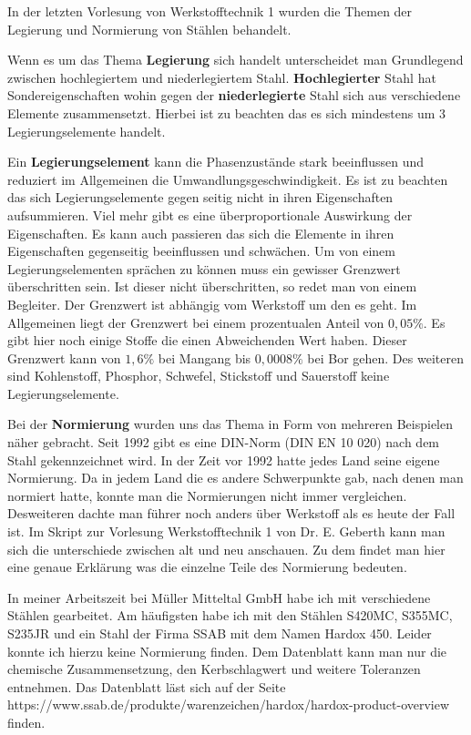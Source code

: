 \documentclass[12pt]{scrreprt}
\begin{document}
In der letzten Vorlesung von Werkstofftechnik 1 wurden die Themen der Legierung und Normierung von Stählen behandelt.\par\medskip 

Wenn es um das Thema \textbf{Legierung} sich handelt unterscheidet man Grundlegend zwischen hochlegiertem und niederlegiertem Stahl.
\textbf{Hochlegierter} Stahl hat Sondereigenschaften wohin gegen der \textbf{niederlegierte} Stahl sich aus verschiedene Elemente zusammensetzt. Hierbei ist zu beachten das es sich mindestens um 3 Legierungselemente handelt.\par\smallskip

Ein \textbf{Legierungselement} kann die Phasenzustände stark beeinflussen und reduziert im Allgemeinen die Umwandlungsgeschwindigkeit. 
Es ist zu beachten das sich Legierungselemente gegen seitig nicht in ihren Eigenschaften aufsummieren. Viel mehr gibt es eine überproportionale Auswirkung der Eigenschaften. Es kann auch passieren das sich die Elemente in ihren Eigenschaften gegenseitig beeinflussen und schwächen. 
Um von einem Legierungselementen sprächen zu können muss ein gewisser Grenzwert überschritten sein. Ist dieser nicht überschritten, so redet man von einem Begleiter. 
Der Grenzwert ist abhängig vom Werkstoff um den es geht. Im Allgemeinen liegt der Grenzwert bei einem prozentualen Anteil von $0,05\%$. Es gibt hier noch einige Stoffe die einen Abweichenden Wert haben. 
Dieser Grenzwert kann von $1,6\%$ bei Mangang bis $0,0008\%$ bei Bor gehen. Des weiteren sind  Kohlenstoff, Phosphor, Schwefel, Stickstoff und Sauerstoff keine Legierungselemente.\par\smallskip

Bei der \textbf{Normierung} wurden uns das Thema in Form von mehreren Beispielen näher gebracht. Seit 1992 gibt es eine DIN-Norm (DIN EN 10 020) nach dem Stahl gekennzeichnet wird. 
In der Zeit vor 1992 hatte jedes Land seine eigene Normierung. Da in jedem Land die es andere Schwerpunkte gab, nach denen man normiert hatte, konnte man die Normierungen nicht immer vergleichen. 
Desweiteren dachte man führer noch anders über Werkstoff als es heute der Fall ist. Im Skript zur Vorlesung Werkstofftechnik 1 von Dr. E. Geberth kann man sich die unterschiede zwischen alt und neu anschauen. Zu dem findet man hier eine genaue Erklärung was die einzelne Teile des Normierung bedeuten. \par\smallskip

In meiner Arbeitszeit bei Müller Mitteltal GmbH habe ich mit verschiedene Stählen gearbeitet. Am häufigsten habe ich mit den Stählen S420MC, S355MC, S235JR und ein Stahl der Firma SSAB mit dem Namen Hardox 450. 
Leider konnte ich hierzu keine Normierung finden. Dem Datenblatt kann man nur die chemische Zusammensetzung, den Kerbschlagwert und weitere Toleranzen entnehmen. Das Datenblatt läst sich auf der Seite \\
https://www.ssab.de/produkte/warenzeichen/hardox/hardox-product-overview finden. \par\medskip
\end{document}

